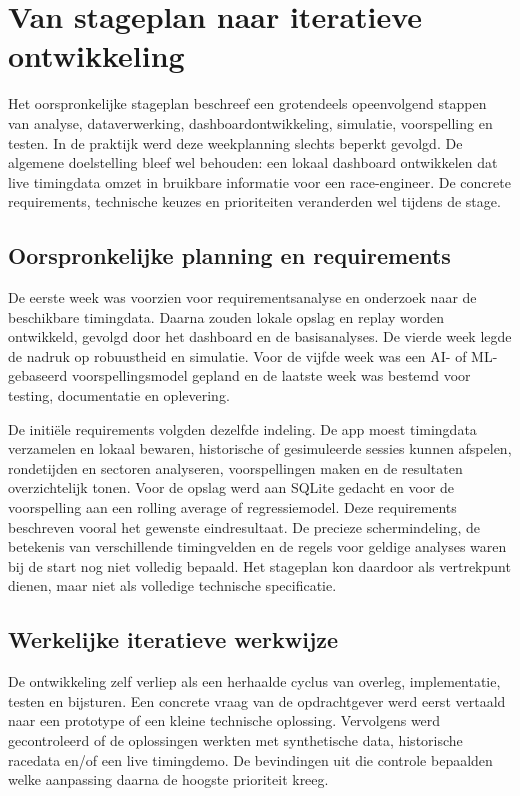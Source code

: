
\chapter{Van stageplan naar iteratieve ontwikkeling}
\label{chap:requirements}

Het oorspronkelijke stageplan beschreef een grotendeels opeenvolgend stappen van analyse,
dataverwerking, dashboardontwikkeling, simulatie, voorspelling en testen. In de praktijk werd
deze weekplanning slechts beperkt gevolgd. De algemene doelstelling bleef wel behouden: een lokaal
dashboard ontwikkelen dat live timingdata omzet in bruikbare informatie voor een race-engineer.
De concrete requirements, technische keuzes en prioriteiten veranderden wel tijdens de stage.

\section{Oorspronkelijke planning en requirements}
De eerste week was voorzien voor requirementsanalyse en onderzoek naar de beschikbare timingdata.
Daarna zouden lokale opslag en replay worden ontwikkeld, gevolgd door het dashboard en de
basisanalyses. De vierde week legde de nadruk op robuustheid en simulatie. Voor de vijfde week was
een AI- of ML-gebaseerd voorspellingsmodel gepland en de laatste week was bestemd voor testing,
documentatie en oplevering.

De initiële requirements volgden dezelfde indeling. De app moest timingdata verzamelen en
lokaal bewaren, historische of gesimuleerde sessies kunnen afspelen, rondetijden en sectoren
analyseren, voorspellingen maken en de resultaten overzichtelijk tonen. Voor de opslag werd aan
SQLite gedacht en voor de voorspelling aan een rolling average of regressiemodel.
Deze requirements beschreven vooral het gewenste eindresultaat. De precieze schermindeling, de
betekenis van verschillende timingvelden en de regels voor geldige analyses waren bij de start nog
niet volledig bepaald. Het stageplan kon daardoor als vertrekpunt dienen, maar niet als volledige
technische specificatie.

\section{Werkelijke iteratieve werkwijze}

De ontwikkeling zelf verliep als een herhaalde cyclus van overleg, implementatie, testen en bijsturen.
Een concrete vraag van de opdrachtgever werd eerst vertaald naar een prototype of een
kleine technische oplossing. Vervolgens werd gecontroleerd of de oplossingen werkten met synthetische data,
historische racedata en/of een live timingdemo. De bevindingen uit die controle
bepaalden welke aanpassing daarna de hoogste prioriteit kreeg.

